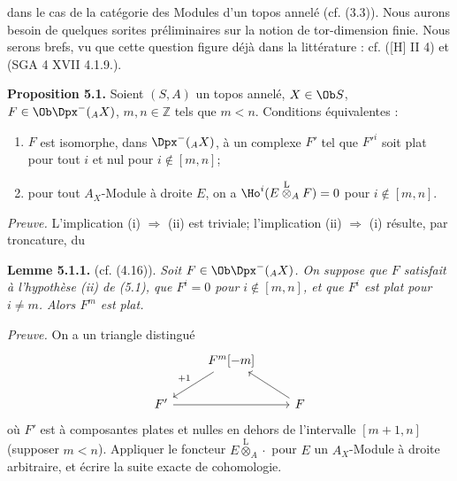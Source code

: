 dans le cas de la catégorie des Modules d'un topos annelé (cf. (3.3)). Nous aurons besoin de quelques sorites préliminaires sur la notion de tor-dimension finie. Nous serons brefs, vu que cette question figure déjà dans la littérature : cf. ([H] II 4) et (SGA 4 XVII 4.1.9.).

\textbf{Proposition 5.1.} Soient \((S,A)\) un topos annelé, \(X\in\Ob S\), \(F\in\Ob\Dpx^-({}_A X)\), \(m,n\in\mathbb Z\) tels que \(m<n\). Conditions équivalentes :
\begin{enumerate}[label=(\roman*)]
\item \(F\) est isomorphe, dans \(\Dpx^-({}_A X)\), à un complexe \(F'\) tel que \(F'^i\) soit plat pour tout \(i\) et nul pour \(i\notin[m,n]\);
\item pour tout \(A_X\)-Module à droite \(E\), on a \(\Ho^i(E\overset{\mathrm L}{\otimes}_A F)=0\) pour \(i\notin[m,n]\).
\end{enumerate}

\emph{Preuve.} L'implication (i) \(\Rightarrow\) (ii) est triviale; l'implication (ii) \(\Rightarrow\) (i) résulte, par troncature, du

\textbf{Lemme 5.1.1.} (cf. (4.16)). \emph{Soit \(F\in\Ob\Dpx^-({}_A X)\). On suppose que \(F\) satisfait à l'hypothèse (ii) de (5.1), que \(F^i=0\) pour \(i\notin[m,n]\), et que \(F^i\) est plat pour \(i\ne m\). Alors \(F^m\) est plat.}

\emph{Preuve.} On a un triangle distingué
\[
\begin{tikzcd}
& F^m[-m] \arrow[dl,"+1"'] & \\
F' \arrow[rr] && F \arrow[ul]
\end{tikzcd}
\]
où \(F'\) est à composantes plates et nulles en dehors de l'intervalle \([m+1,n]\) (supposer \(m<n\)). Appliquer le foncteur \(E\overset{\mathrm L}{\otimes}_A\cdot\) pour \(E\) un \(A_X\)-Module à droite arbitraire, et écrire la suite exacte de cohomologie.


